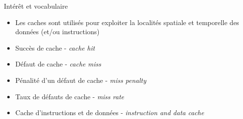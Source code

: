 %
\begin{Frame}{Intérêt et vocabulaire}


      \begin{block}{}
        \begin{itemize}
        \item Les caches sont utilisés pour exploiter la localités spatiale et temporelle des données (et/ou instructions)
        \end{itemize}
      \end{block} 


      \begin{block}{}
        \begin{itemize}
        \item Succès de cache - \emph{cache hit}
        \item Défaut de cache - \emph{cache miss}
        \item Pénalité d'un défaut de cache - \emph{miss penalty}
        \item Taux de défauts de cache - \emph{miss rate}
        \item Cache d'instructions et de données - \emph{instruction and data cache}
        \end{itemize}
      \end{block} 
      
\end{Frame}


